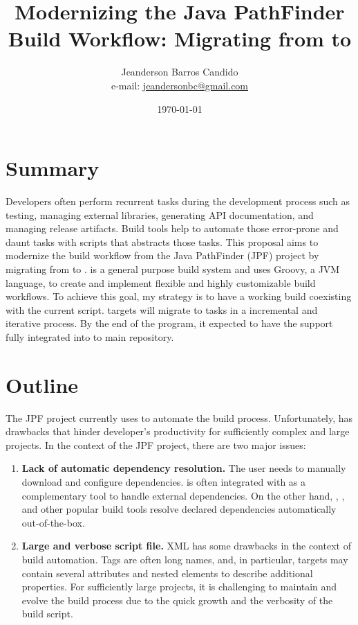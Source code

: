 \documentclass{article}
\author{Jeanderson Barros Candido\\e-mail: \url{jeandersonbc@gmail.com}}
\title{Modernizing the Java PathFinder Build Workflow: Migrating from \ant{} to
\gradle{}}
\date{\today}
\begin{document}
\maketitle

\section{Summary}

Developers often perform recurrent tasks during the development process such
as testing, managing external libraries, generating API documentation, and
managing release artifacts.
Build tools help to automate those error-prone and daunt tasks with scripts
that abstracts those tasks.
This proposal aims to modernize the build workflow from the Java PathFinder
(JPF) project by migrating from \ant{} to \gradle{}.
\gradle{} is a general purpose build system and uses Groovy, a JVM language, to
create and implement flexible and highly customizable build workflows.
To achieve this goal, my strategy is to have a working \gradle{} build
coexisting with the current \ant{} script.
\ant{} targets will migrate to \gradle{} tasks in a incremental and
iterative process.
By the end of the program, it expected to have the \gradle{} support fully
integrated into to main repository.

\section{Outline}
\label{sec:intro}

The JPF project currently uses \ant{} to automate the build process.
Unfortunately, \ant{} has drawbacks that hinder developer's productivity for
sufficiently complex and large projects.
In the context of the JPF project, there are two major issues:

\begin{enumerate}

\item \textbf{Lack of automatic dependency resolution.}
The user needs to manually download and configure dependencies.
\ant{} is often integrated with \ivy{}\cite{page:ivy} as a complementary
tool to handle external dependencies.
On the other hand, \gradle{}\cite{page:gradle}, \maven{}\cite{page:maven},
and other popular build tools resolve declared dependencies automatically
out-of-the-box.

\item \textbf{Large and verbose script file.}
XML has some drawbacks in the context of build automation.
Tags are often long names, and, in particular, \ant{} targets may
contain several attributes and nested elements to describe additional
properties.
For sufficiently large projects, it is challenging to maintain and evolve the
build process due to the quick growth and the verbosity of the build script.

\end{enumerate}
\end{document}
